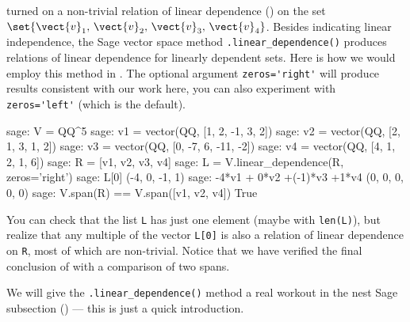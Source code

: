  turned on a non-trivial relation of linear dependence () on the set $\set{\vect{v}_1,\,\vect{v}_2,\,\vect{v}_3,\,\vect{v}_4}$.  Besides indicating linear independence, the Sage vector space method \verb?.linear_dependence()? produces relations of linear dependence for linearly dependent sets.  Here is how we would employ this method in .  The optional argument \verb?zeros='right'? will produce results consistent with our work here, you can also experiment with \verb?zeros='left'? (which is the default).
%
\begin{sageexample}
sage: V = QQ^5
sage: v1 = vector(QQ, [1,  2, -1,   3,  2])
sage: v2 = vector(QQ, [2,  1,  3,   1,  2])
sage: v3 = vector(QQ, [0, -7,  6, -11, -2])
sage: v4 = vector(QQ, [4,  1,  2,   1,  6])
sage: R = [v1, v2, v3, v4]
sage: L = V.linear_dependence(R, zeros='right')
sage: L[0]
(-4, 0, -1, 1)
sage: -4*v1 + 0*v2 +(-1)*v3 +1*v4
(0, 0, 0, 0, 0)
sage: V.span(R) == V.span([v1, v2, v4])
True
\end{sageexample}
%
You can check that the list \verb?L? has just one element (maybe with \verb?len(L)?), but realize that any multiple of the vector \verb?L[0]? is also a relation of linear dependence on \verb?R?, most of which are non-trivial.  Notice that we have verified the final conclusion of  with a comparison of two spans.\par
%
We will give the \verb?.linear_dependence()? method a real workout in the nest Sage subsection () --- this is just a quick introduction.
%
\begin{sageverbatim}
\end{sageverbatim}
%
